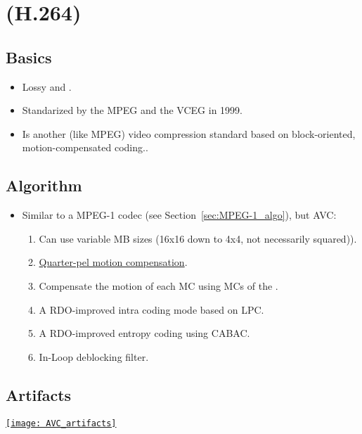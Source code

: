 \chapter{ (H.264)}

\section{Basics}
\begin{itemize}
\item Lossy and .
\item Standarized by the \gls{MPEG} and the \gls{VCEG} in 1999.
\item Is another (like \gls{MPEG}) video compression standard based on
  block-oriented, motion-compensated coding..
\end{itemize}

\section{Algorithm}
\begin{itemize}
\item Similar to a MPEG-1 codec (see Section~\ref{sec:MPEG-1_algo}),
  but \gls{AVC}:
\begin{enumerate}
\item Can use variable MB sizes (16x16 down to 4x4, not
  necessarily squared)).
\item
  \href{https://en.wikipedia.org/wiki/Motion_compensation}{Quarter-pel
    motion compensation}.
\item Compensate the motion of each MC using MCs of the
  .
\item A \gls{RDO}-improved intra coding mode based on \gls{LPC}.
\item A \gls{RDO}-improved entropy coding using \gls{CABAC}.
\item In-Loop deblocking filter.
\end{enumerate}
\end{itemize}

\section{Artifacts}
\begin{center}
  \href{https://www.sciencedirect.com/science/article/pii/B9780124157606000167}{\texttt{[image: AVC\_artifacts]}}
\end{center}
